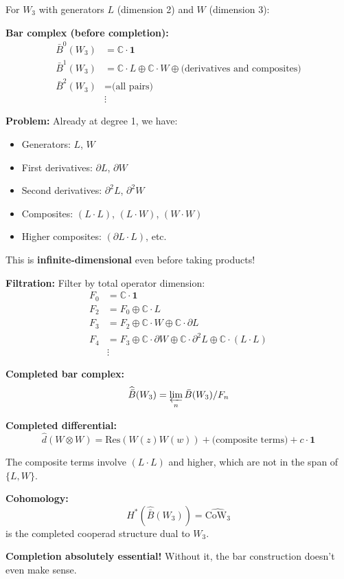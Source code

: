 \begin{example}\label{ex:w3-bar-completion}
For $W_3$ with generators $L$ (dimension 2) and $W$ (dimension 3):

\textbf{Bar complex (before completion):}
\begin{align}
\bar{B}^0(W_3) &= \mathbb{C} \cdot \mathbf{1} \\
\bar{B}^1(W_3) &= \mathbb{C} \cdot L \oplus \mathbb{C} \cdot W \oplus \text{(derivatives and composites)} \\
\bar{B}^2(W_3) &= \text{(all pairs)} \\
&\vdots
\end{align}

\textbf{Problem:} Already at degree 1, we have:
\begin{itemize}
\item Generators: $L$, $W$
\item First derivatives: $\partial L$, $\partial W$
\item Second derivatives: $\partial^2 L$, $\partial^2 W$
\item Composites: $(L \cdot L)$, $(L \cdot W)$, $(W \cdot W)$
\item Higher composites: $(\partial L \cdot L)$, etc.
\end{itemize}

This is \textbf{infinite-dimensional} even before taking products!

\textbf{Filtration:} Filter by total operator dimension:
\begin{align}
F_0 &= \mathbb{C} \cdot \mathbf{1} \\
F_2 &= F_0 \oplus \mathbb{C} \cdot L \\
F_3 &= F_2 \oplus \mathbb{C} \cdot W \oplus \mathbb{C} \cdot \partial L \\
F_4 &= F_3 \oplus \mathbb{C} \cdot \partial W \oplus \mathbb{C} \cdot \partial^2 L 
\oplus \mathbb{C} \cdot (L \cdot L) \\
&\vdots
\end{align}

\textbf{Completed bar complex:}
$$\widehat{\bar{B}}(W_3) = \varprojlim_n \bar{B}(W_3)/F_n$$

\textbf{Completed differential:}
$$\widehat{d}(W \otimes W) = \text{Res}(W(z)W(w)) + \text{(composite terms)} + c \cdot \mathbf{1}$$

The composite terms involve $(L \cdot L)$ and higher, which are not in the span of $\{L, W\}$.

\textbf{Cohomology:}
$$H^*(\widehat{\bar{B}}(W_3)) = \widehat{\text{CoW}_3}$$
is the completed cooperad structure dual to $W_3$.

\textbf{Completion absolutely essential!} Without it, the bar construction doesn't even make sense.
\end{example}

